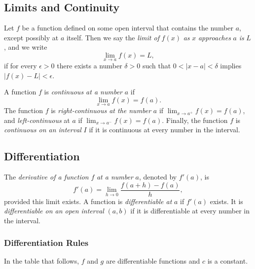 \documentclass[captions=tableheading]{scrbook}
\begin{document}
\begin{example}
\subsection{Limits and Continuity}
\label{sec-21-2-1}

\begin{defn}
Let \(f\) be a function defined on some open interval that contains the number \(a\), except possibly at \(a\) itself. Then we say the \emph{limit of} \(f(x)\) \emph{as} \(x\) \emph{approaches} \(a\) \emph{is} \(L\), and we write 
\begin{equation}
\lim_{x \to a}f(x) = L,
\end{equation}
if for every \(\epsilon > 0\) there exists a number \(\delta > 0\) such that \(0 < |x-a| < \delta\) implies \(|f(x) - L| < \epsilon\).
\end{defn}

\begin{defn}
A function \(f\) is \emph{continuous at a number} \(a\) if 
\begin{equation}
\lim_{x \to a} f(x) = f(a).
\end{equation}
The function \(f\) is \emph{right-continuous at the number} \(a\) if \(\lim_{x\to a^{+}}f(x)=f(a)\), and \emph{left-continuous} at \(a\) if \(\lim_{x\to a^{-}}f(x)=f(a)\). Finally, the function \(f\) is \emph{continuous on an interval} \(I\) if it is continuous at every number in the interval. 
\end{defn}
\subsection{Differentiation}
\label{sec-21-2-2}

\begin{defn}
The \emph{derivative of a function} \(f\) \emph{at a number} \(a\), denoted by \(f'(a)\), is
\begin{equation}
f'(a)=\lim_{h\to0}\frac{f(a+h)-f(a)}{h},
\end{equation}
provided this limit exists.
A function is \emph{differentiable at} \(a\) if \(f'(a)\) exists. It is \emph{differentiable on an open interval} \((a,b)\) if it is differentiable at every number in the interval.
\end{defn}
\subsubsection{Differentiation Rules}
\label{sec-21-2-2-1}

In the table that follows, \(f\) and \(g\) are differentiable functions and \(c\) is a constant.


\end{example}
\end{document}
